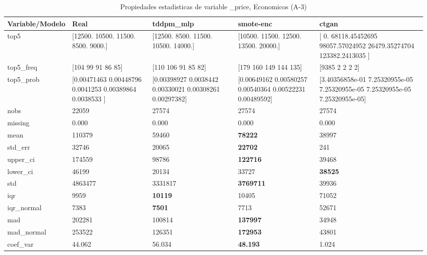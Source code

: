 \begin{table}[H]
\centering
\fontsize{8}{14}\selectfont
\caption{Propiedades  estadisticas de variable \_price, Economicos (A-3)}
\label{table-stats-economicos-a-3-_price}
\begin{tabular}{|l|m{10em}|m{10em}|m{10em}|m{10em}|}
\hline
 \rowcolor[gray]{0.8}
Variable/Modelo & Real & tddpm\_mlp & smote-enc & ctgan \\
\hline top5 & [12500. 10500. 11500.  8500.  9000.] & [12500.  8500. 11500. 10500. 14000.] & [10500. 11500. 12500. 13500. 20000.] & [     0.          68118.45452695  98057.57024952  26479.35274704
 123382.2413035 ] \\
\hline top5\_freq & [104  99  91  86  85] & [110 106  91  85  82] & [179 160 149 144 135] & [9385    2    2    2    2] \\
\hline top5\_prob & [0.00471463 0.00448796 0.0041253  0.00389864 0.0038533 ] & [0.00398927 0.0038442  0.00330021 0.00308261 0.00297382] & [0.00649162 0.00580257 0.00540364 0.00522231 0.00489592] & [3.40356858e-01 7.25320955e-05 7.25320955e-05 7.25320955e-05
 7.25320955e-05] \\
\hline nobs & 22059 & 27574 & 27574 & 27574 \\
\hline missing & 0.000 & 0.000 & 0.000 & 0.000 \\
\hline mean & 110379 & 59460 & \bfseries 78222 & \cellcolor[rgb]{0.9, 0.54, 0.52} 38997 \\
\hline std\_err & 32746 & 20065 & \bfseries 22702 & \cellcolor[rgb]{0.9, 0.54, 0.52} 241 \\
\hline upper\_ci & 174559 & 98786 & \bfseries 122716 & \cellcolor[rgb]{0.9, 0.54, 0.52} 39468 \\
\hline lower\_ci & 46199 & \cellcolor[rgb]{0.9, 0.54, 0.52} 20134 & 33727 & \bfseries 38525 \\
\hline std & 4863477 & 3331817 & \bfseries 3769711 & \cellcolor[rgb]{0.9, 0.54, 0.52} 39936 \\
\hline iqr & 9959 & \bfseries 10119 & 10405 & \cellcolor[rgb]{0.9, 0.54, 0.52} 71052 \\
\hline iqr\_normal & 7383 & \bfseries 7501 & 7713 & \cellcolor[rgb]{0.9, 0.54, 0.52} 52671 \\
\hline mad & 202281 & 100814 & \bfseries 137997 & \cellcolor[rgb]{0.9, 0.54, 0.52} 34948 \\
\hline mad\_normal & 253522 & 126351 & \bfseries 172953 & \cellcolor[rgb]{0.9, 0.54, 0.52} 43801 \\
\hline coef\_var & 44.062 & 56.034 & \bfseries 48.193 & \cellcolor[rgb]{0.9, 0.54, 0.52} 1.024 \\

\end{tabular}
\end{table}
